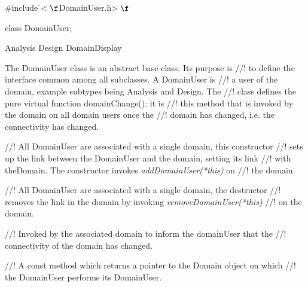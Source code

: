 

\indent \#include \f$<\f$DomainUser.h\f$>\f$

\indent class DomainUser;

\indent\indent Analysis
\indent\indent Design
\indent\indent DomainDisplay

\indent The DomainUser class is an abstract base class. Its purpose is
//! to define the interface common among all subclasses.  A DomainUser is
//! a user of the domain, example subtypes being Analysis and Design. The
//! class defines the pure virtual function domainChange(): it is
//! this method that is invoked by the domain on all domain users once the
//! domain has changed, i.e. the connectivity has changed.

//! All DomainUser are associated with a single domain, this constructor
//! sets up the link between the DomainUser and the domain, setting its link
//! with theDomain. The constructor invokes {\em addDomainUser(*this)} on
//! the domain.  

//! All DomainUser are associated with a single domain, the destructor
//! removes the link in the domain by invoking {\em removeDomainUser(*this)}
//! on the domain.

//! Invoked by the associated domain to inform the domainUser that the
//! connectivity of the domain has changed.


//! A const method which returns a pointer to the Domain object on which
//! the DomainUser performs its DomainUser.




